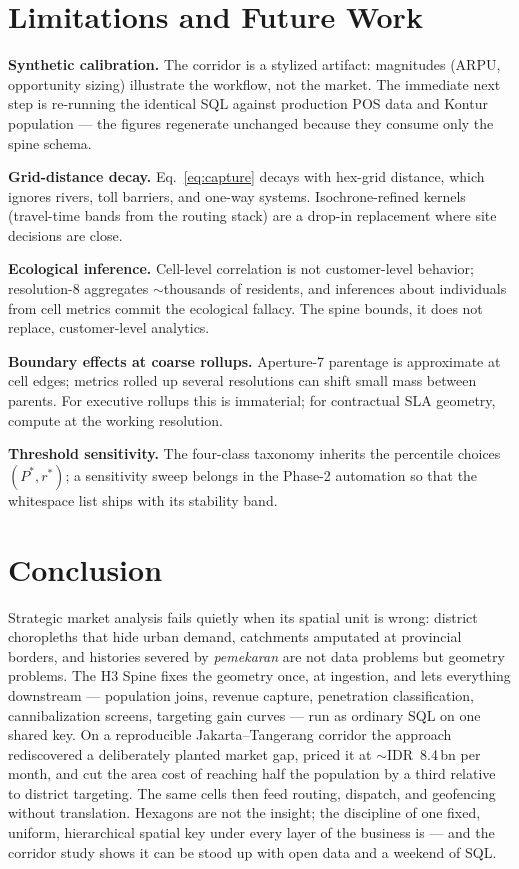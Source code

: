 \documentclass[11pt,a4paper,twocolumn]{article}
\begin{document}
\section{Limitations and Future Work}
\label{sec:limitations}

\textbf{Synthetic calibration.} The corridor is a stylized artifact:
magnitudes (ARPU, opportunity sizing) illustrate the workflow, not the
market. The immediate next step is re-running the identical SQL against
production POS data and Kontur population --- the figures regenerate
unchanged because they consume only the spine schema.

\textbf{Grid-distance decay.} Eq.~\eqref{eq:capture} decays with hex-grid
distance, which ignores rivers, toll barriers, and one-way systems.
Isochrone-refined kernels (travel-time bands from the routing stack) are
a drop-in replacement where site decisions are close.

\textbf{Ecological inference.} Cell-level correlation is not
customer-level behavior; resolution-8 aggregates ${\sim}$thousands of
residents, and inferences about individuals from cell metrics commit the
ecological fallacy. The spine bounds, it does not replace,
customer-level analytics.

\textbf{Boundary effects at coarse rollups.} Aperture-7 parentage is
approximate at cell edges; metrics rolled up several resolutions can
shift small mass between parents. For executive rollups this is
immaterial; for contractual SLA geometry, compute at the working
resolution.

\textbf{Threshold sensitivity.} The four-class taxonomy inherits the
percentile choices $(P^{*}, r^{*})$; a sensitivity sweep belongs in the
Phase-2 automation so that the whitespace list ships with its stability
band.

\section{Conclusion}
\label{sec:conclusion}

Strategic market analysis fails quietly when its spatial unit is wrong:
district choropleths that hide urban demand, catchments amputated at
provincial borders, and histories severed by \emph{pemekaran} are not
data problems but geometry problems. The H3 Spine fixes the geometry
once, at ingestion, and lets everything downstream --- population joins,
revenue capture, penetration classification, cannibalization screens,
targeting gain curves --- run as ordinary SQL on one shared key. On a
reproducible Jakarta--Tangerang corridor the approach rediscovered a
deliberately planted market gap, priced it at ${\sim}$IDR~8.4\,bn per
month, and cut the area cost of reaching half the population by a third
relative to district targeting. The same cells then feed routing,
dispatch, and geofencing without translation. Hexagons are not the
insight; the discipline of one fixed, uniform, hierarchical spatial key
under every layer of the business is --- and the corridor study shows it
can be stood up with open data and a weekend of SQL.
\end{document}
